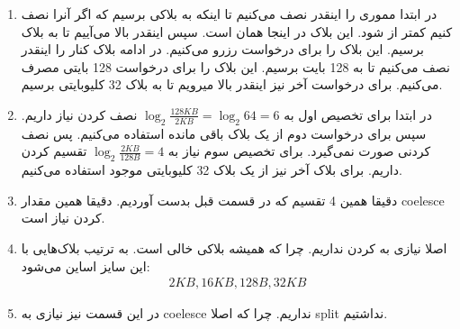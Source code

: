 \begin{enumerate}
    \item در ابتدا مموری را اینقدر نصف می‌کنیم تا اینکه به بلاکی برسیم که اگر آنرا نصف کنیم کمتر از
    شود. این بلاک در اینجا همان
    است. سپس اینقدر بالا می‌آییم تا به بلاک
    برسیم. این بلاک را برای درخواست
    رزرو می‌کنیم.
    در ادامه بلاک کنار
    را اینقدر نصف می‌کنیم تا به 128 بایت برسیم. این بلاک را برای درخواست
    128 بایتی مصرف می‌کنیم.
    برای درخواست آخر نیز اینقدر بالا میرویم تا به بلاک
    32 کلیوبایتی برسیم.
    \item در ابتدا برای تخصیص اول به $\log_2{\frac{128 KB}{2 KB}} = \log_2{64} = 6$
    نصف کردن نیاز داریم.
    سپس برای درخواست دوم از
    یک بلاک
    باقی مانده استفاده می‌کنیم. پس نصف کردنی صورت نمی‌گیرد.
    برای تخصیص سوم نیاز به
    $\log_2{\frac{2 KB}{128 B}} = 4$
    تقسیم کردن داریم. برای بلاک آخر نیز از یک بلاک 32 کلیوبایتی موجود استفاده می‌کنیم.
    \item دقیقا همین 4 تقسیم که در قسمت قبل بدست آوردیم. دقیقا همین مقدار coelesce کردن نیاز است.
    \item اصلا نیازی به  کردن نداریم.
    چرا که همیشه بلاکی خالی است. به ترتیب بلاک‌هایی با این سایز اساین می‌شود:
    \begin{gather*}
        2KB, 16KB, 128B, 32KB
    \end{gather*}
    \item در این قسمت نیز نیازی به coelesce نداریم. چرا که اصلا split نداشتیم.
\end{enumerate}


